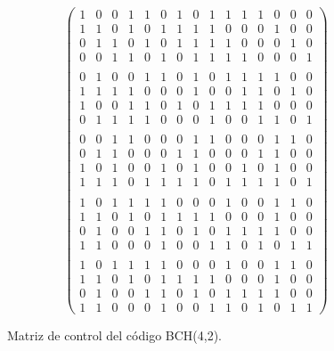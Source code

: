 \begin{figure}[!h]
\begin{displaymath}
\left( \begin{array}{ccccccccccccccc}
1&0&0&1&1&0&1&0&1&1&1&1&0&0&0\\
1&1&0&1&0&1&1&1&1&0&0&0&1&0&0\\
0&1&1&0&1&0&1&1&1&1&0&0&0&1&0\\
0&0&1&1&0&1&0&1&1&1&1&0&0&0&1\\
\\
0&1&0&0&1&1&0&1&0&1&1&1&1&0&0\\
1&1&1&1&0&0&0&1&0&0&1&1&0&1&0\\
1&0&0&1&1&0&1&0&1&1&1&1&0&0&0\\
0&1&1&1&1&0&0&0&1&0&0&1&1&0&1\\
\\
0&0&1&1&0&0&0&1&1&0&0&0&1&1&0\\
0&1&1&0&0&0&1&1&0&0&0&1&1&0&0\\
1&0&1&0&0&1&0&1&0&0&1&0&1&0&0\\
1&1&1&0&1&1&1&1&0&1&1&1&1&0&1\\
\\
1&0&1&1&1&1&0&0&0&1&0&0&1&1&0\\
1&1&0&1&0&1&1&1&1&0&0&0&1&0&0\\
0&1&0&0&1&1&0&1&0&1&1&1&1&0&0\\
1&1&0&0&0&1&0&0&1&1&0&1&0&1&1\\
\\
1&0&1&1&1&1&0&0&0&1&0&0&1&1&0\\
1&1&0&1&0&1&1&1&1&0&0&0&1&0&0\\
0&1&0&0&1&1&0&1&0&1&1&1&1&0&0\\
1&1&0&0&0&1&0&0&1&1&0&1&0&1&1
\end{array} \right)
\end{displaymath}
\caption{Matriz de control del c\'odigo BCH(4,2).}\label{fig:PrimerBCH}
\end{figure}
